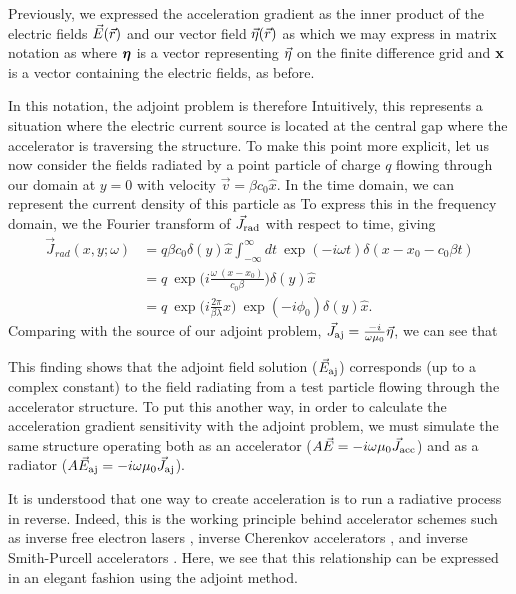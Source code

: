 Previously, we expressed the acceleration gradient as the inner product of the electric fields $\vec{E}(\vec{r})$ and our vector field $\vec{\eta}(\vec{r})$ as
%
%
which we may express in matrix notation as
%
%
where $\bm{\eta}$ is a vector representing $\vec{\eta}$ on the finite difference grid and $\mathbf{x}$ is a vector containing the electric fields, as before.

In this notation, the adjoint problem is therefore
%
%
Intuitively, this represents a situation where the electric current source is located at the central gap where the accelerator is traversing the structure.
To make this point more explicit, let us now consider the fields radiated by a point particle of charge $q$ flowing through our domain at $y = 0$ with velocity $\vec{v} = \beta c_0 \hat{x}$.
In the time domain, we can represent the current density of this particle as
%
%
To express this in the frequency domain, we the Fourier transform of $\vec{J}_\textrm{rad}$ with respect to time, giving
%
\begin{align}
    \vec{J}_{rad}(x,y;\omega) &= q \beta c_0 \delta(y)\hat{x}\int _{-\infty}^{\infty}{dt\ }\exp(-i\omega t)\delta(x-x_0-c_0\beta t)\\
    &= q\ \exp\Big(i\frac{\omega\ (x-x_0)}{c_0 \beta}\Big)\delta(y)\hat{x}\\
    &= q\ \exp\Big(i\frac{2\pi}{ \beta\lambda}x\Big)\ \exp(-i\phi_0)\delta(y)\hat{x}.
\label{eq:point-current}
\end{align}
%
Comparing with the source of our adjoint problem, $\vec{J}_{\textrm{aj}} = \frac{-i}{\omega\mu_0}\vec{\eta}$, we can see that 
%

This finding shows that the adjoint field solution ($\vec{E}_{\textrm{aj}}$) corresponds (up to a complex constant) to the field radiating from a test particle flowing through the accelerator structure.
To put this another way, in order to calculate the acceleration gradient sensitivity with the adjoint problem, we must simulate the same structure operating both as an accelerator ($A\vec{E}=-i\omega\mu_0\vec{J}_\textrm{acc}$) and as a radiator ($A\vec{E}_{\textrm{aj}}=-i\omega\mu_0\vec{J}_{\textrm{aj}}$).

It is understood that one way to create acceleration is to run a radiative process in reverse.
Indeed, this is the working principle behind accelerator schemes such as inverse free electron lasers \cite{musumeci2005high, courant1985high}, inverse Cherenkov accelerators \cite{kimura1995laser, fontana1983high}, and inverse Smith-Purcell accelerators \cite{bae1992experimental, mizuno1987experimental}.
Here, we see that this relationship can be expressed in an elegant fashion using the adjoint method.

